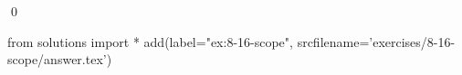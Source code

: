 
\begin{ex}
  \label{ex:8-16-scope}
  
  \qed
\end{ex}
\begin{python0}
from solutions import *
add(label="ex:8-16-scope",
    srcfilename='exercises/8-16-scope/answer.tex')
\end{python0}

